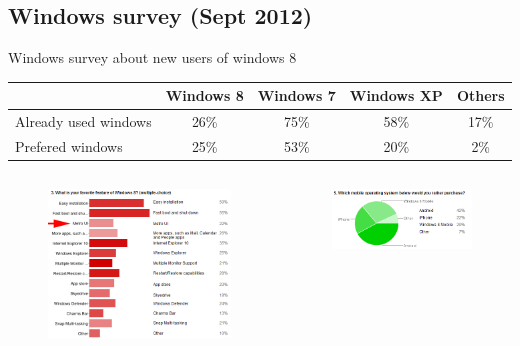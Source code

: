 \documentclass{beamer}
\begin{document}
\subsection{Windows survey (Sept 2012)}
\begin{frame}{Windows survey about new users of windows 8}
	
    \small
    \begin{center}
      \begin{tabular}{|l|c|c|c|c|}
        \hline
        & Windows 8 & Windows 7 & Windows XP & Others\\
        \hline
        Already used windows & 26\%	& 75\%	& 58\%	& 17\% \\
        Prefered windows	 & 25\%	& 53\%	& 20\%	& 2\% \\
        \hline
      \end{tabular}
    \end{center}
    \normalsize
    \begin{columns}[c]
      \begin{figure}
        \centering
        \includegraphics[scale=0.25]{windows8UI.jpg}
      \end{figure}
      \begin{figure}
        \centering
        \includegraphics[scale=0.25]{windows8Phone.png}
      

\end{figure}
\end{columns}
\end{frame}
\end{document}
